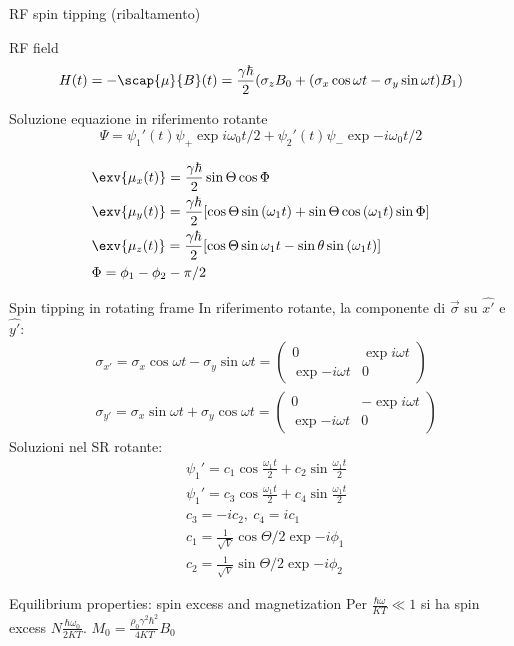 \begin{frame}{RF spin tipping (ribaltamento)}
\begin{block}{RF field}
\begin{equation*}
H(t)=-\scap{\mu}{B}(t)=\frac{\gamma\hbar}{2}(\sigma_zB_0+(\sigma_x\cos{\omega t}-\sigma_y\sin{\omega t})B_1)
\end{equation*}
\end{block}
\begin{block}{Soluzione equazione \scr{} in riferimento rotante}
\begin{equation*}\Psi=\psi_1'(t)\psi_+\exp{i\omega_0t/2}+\psi_2'(t)\psi_-\exp{-i\omega_0t/2}\end{equation*}
\end{block}
\begin{align*}
&\exv{\mu_x(t)}=\frac{\gamma\hbar}{2}\sin{\Theta}\cos{\Phi}\\
&\exv{\mu_y(t)}=\frac{\gamma\hbar}{2}[\cos{\Theta}\sin{(\omega_1t)}+\sin{\Theta}\cos{(\omega_1t)}\sin{\Phi}]\\
&\exv{\mu_z(t)}=\frac{\gamma\hbar}{2}[\cos{\Theta}\sin{\omega_1t}-\sin{\theta}\sin{(\omega_1t)}]\\
&\Phi=\phi_1-\phi_2-\pi/2
\end{align*}

\end{frame}

\begin{wordonframe}{Spin tipping in rotating frame}
In riferimento rotante, la componente di $\vec{\sigma}$ su $\hat{x'}$ e $\hat{y'}$:
\begin{align*}
&\sigma_{x'}=\sigma_{x}\cos{\omega t}-\sigma_{y}\sin{\omega t}=\begin{pmatrix}0&\exp{i\omega t}\\\exp{-i\omega t}&0\end{pmatrix}\\
&\sigma_{y'}=\sigma_{x}\sin{\omega t}+\sigma_{y}\cos{\omega t}=\begin{pmatrix}0&-\exp{i\omega t}\\\exp{-i\omega t}&0\end{pmatrix}
\end{align*}
Soluzioni nel SR rotante:
\begin{align*}
&\psi_1'=c_1\cos{\frac{\omega_1t}{2}}+c_2\sin{\frac{\omega_1t}{2}}\\
&\psi_1'=c_3\cos{\frac{\omega_1t}{2}}+c_4\sin{\frac{\omega_1t}{2}}\\
&c_3=-ic_2,\ c_4=ic_1\\
&c_1=\frac{1}{\sqrt{V}}\cos{\Theta/2}\exp{-i\phi_1}\\
&c_2=\frac{1}{\sqrt{V}}\sin{\Theta/2}\exp{-i\phi_2}
\end{align*}
\end{wordonframe}

\begin{frame}{Equilibrium properties: spin excess and magnetization}
Per $\frac{\hbar\omega}{KT}\ll1$ si ha spin excess $N\frac{\hbar\omega_0}{2KT}$. 
$M_0=\frac{\rho_0\gamma^2\hbar^2}{4KT}B_0$
\end{frame}
